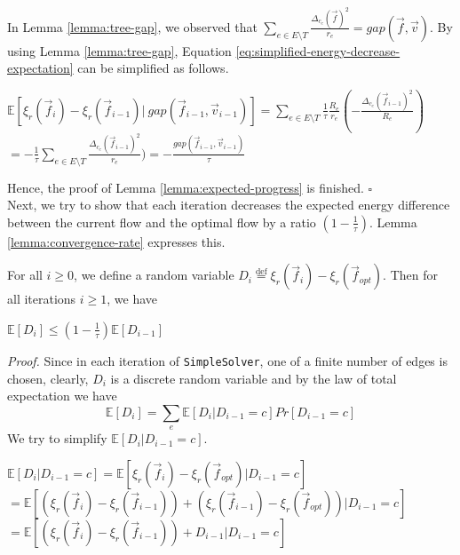 In Lemma \ref{lemma:tree-gap}, we observed that $\sum_{e \in E \setminus T} \frac{\Delta_{c_e}(\overrightarrow{f})^2}{r_e}=gap(\overrightarrow{f},\overrightarrow{v})$. By using Lemma \ref{lemma:tree-gap}, Equation \ref{eq:simplified-energy-decrease-expectation} can be simplified as follows.
\begin{center}
    $\mathds{E}[\xi_r(\overrightarrow{f}_i)-\xi_r(\overrightarrow{f}_{i-1})|~gap(\overrightarrow{f}_{i-1}, \overrightarrow{v}_{i-1})]=\sum_{e \in E\setminus T} \frac{1}{\tau}\frac{R_e}{r_e} (-\frac{\Delta_{c_e}(\overrightarrow{f}_{i-1})^2}{R_e})$\\
    $=-\frac{1}{\tau} \sum_{e \in E\setminus T} \frac{\Delta_{c_e}(\overrightarrow{f}_{i-1})^2}{r_e})=-\frac{gap(\overrightarrow{f}_{i-1}, \overrightarrow{v}_{i-1})}{\tau}$
\end{center}
Hence, the proof of Lemma \ref{lemma:expected-progress} is finished. $\square$ \\
Next, we try to show that each iteration decreases the expected energy difference between the current flow and the optimal flow by a ratio $(1-\frac{1}{\tau})$. Lemma \ref{lemma:convergence-rate} expresses this.
\begin{lemma}
    \label{lemma:convergence-rate}
    For all $i \geq 0$, we define a random variable $D_i \stackrel{\text{def}}{=} \xi_r(\overrightarrow{f}_i)-\xi_r(\overrightarrow{f}_{opt})$. Then for all iterations $i \geq 1$, we have
    \begin{center}
        $\mathds{E}[D_i] \leq (1-\frac{1}{\tau}) \mathds{E}[D_{i-1}]$
    \end{center}
\end{lemma}
\textit{Proof.} Since in each iteration of \texttt{SimpleSolver}, one of a finite number of edges is chosen, clearly, $D_i$ is a discrete random variable and by the law of total expectation we have
\begin{equation}
    \label{eq:D-expectation}
    \mathds{E}[D_i]=\sum_{e} \mathds{E}[D_i|D_{i-1}=c]Pr[D_{i-1}=c]
\end{equation}
We try to simplify $\mathds{E}[D_i|D_{i-1}=c]$.
\begin{center}
    
    $\mathds{E}[D_i|D_{i-1}=c] = \mathds{E}[\xi_r(\overrightarrow{f}_i)-\xi_r(\overrightarrow{f}_{opt})|D_{i-1}=c]$\\
    $= \mathds{E}[(\xi_r(\overrightarrow{f}_i) - \xi_r(\overrightarrow{f}_{i-1}))+(\xi_r(\overrightarrow{f}_{i-1}) - \xi_r(\overrightarrow{f}_{opt}))|D_{i-1}=c] $\\
    $= \mathds{E}[(\xi_r(\overrightarrow{f}_i) - \xi_r(\overrightarrow{f}_{i-1}))+D_{i-1}|D_{i-1}=c] $
\end{center}
